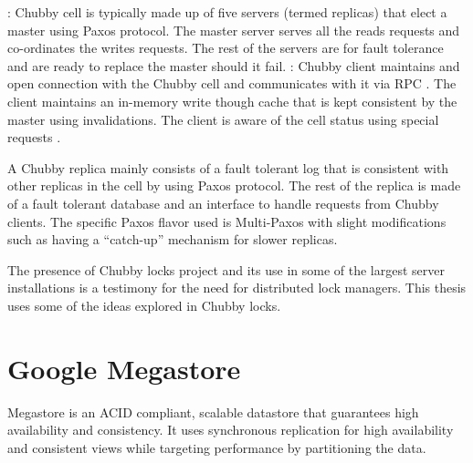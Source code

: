 \begin{itemize}
    : Chubby cell is typically made up of five servers 
    (termed replicas) that elect a master using Paxos protocol. The master
    server serves all the reads requests and co-ordinates the writes requests.
    The rest of the servers are for fault tolerance and are ready to replace the
    master should it fail.
    : Chubby client maintains and open connection with
    the Chubby cell and communicates with it via RPC%
    . The client maintains an in-memory write though cache that
    is kept consistent by the master using invalidations. The client is
    aware of the cell status using special requests%
    .
\end{itemize}

A Chubby replica mainly consists of a fault tolerant log that is consistent
with other replicas in the cell by using Paxos protocol. The rest of the
replica is made of a fault tolerant database and an interface to handle
requests from Chubby clients. The specific Paxos flavor used is Multi-Paxos
with slight modifications such as having a ``catch-up'' mechanism for
slower replicas.

The presence of Chubby locks project and its use in some of the largest 
server installations is a testimony for the need for distributed lock
managers. This thesis uses some of the ideas explored in Chubby locks.

\section{Google Megastore}

Megastore \citep{BakerBCFKLLLLY11} is an ACID%
compliant, scalable datastore that guarantees high availability and
consistency. It uses synchronous replication for high availability and
consistent views while targeting performance by partitioning the data.

